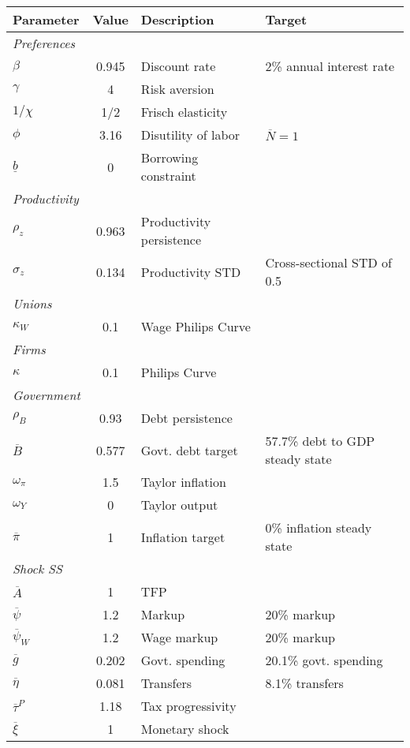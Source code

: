 \begin{tabular}{lcll}
    \toprule
    \textbf{Parameter} & \textbf{Value} & \textbf{Description} & \textbf{Target} \\
    \midrule
    \textit{Preferences} \\
    \quad $\beta$ & 0.945 & Discount rate & 2\% annual interest rate \\
    \quad $\gamma$ & 4 & Risk aversion & \textcite{kaplan2018monetary} \\
    \quad $1/\chi$ & 1/2 & Frisch elasticity & \textcite{chetty2012bounds} \\
    \quad $\phi$ & 3.16 & Disutility of labor & $\overline{N} = 1$ \\
    \quad $\underline{b}$ & 0 & Borrowing constraint \\
    \midrule
    \textit{Productivity} \\
    \quad $\rho_z$ & 0.963 & Productivity persistence & \textcite{storesletten2004cyclical} \\
    \quad $\sigma_z$ & 0.134 & Productivity STD & Cross-sectional STD of 0.5 \\
    \midrule
    \textit{Unions} \\
    \quad $\kappa_W$ & 0.1 & Wage Philips Curve \\
    \midrule
    \textit{Firms} \\
    \quad $\kappa$ & 0.1 & Philips Curve \\
    \midrule
    \textit{Government} \\
    \quad $\rho_B$ & 0.93 & Debt persistence & \textcite{auclert2024intertemporal} \\
    \quad $\overline{B}$ & 0.577 & Govt. debt target & 57.7\% debt to GDP steady state \\
    \quad $\omega_\pi$ & 1.5 & Taylor inflation \\
    \quad $\omega_Y$ & 0 & Taylor output \\
    \quad $\overline{\pi}$ & 1 & Inflation target & 0\% inflation steady state \\
    \midrule
    \textit{Shock SS} \\
    \quad $\overline{A}$ & 1 & TFP \\
    \quad $\overline{\psi}$ & 1.2 & Markup & 20\% markup \\
    \quad $\overline{\psi}_W$ & 1.2 & Wage markup & 20\% markup \\
    \quad $\overline{g}$ & 0.202 & Govt. spending & 20.1\% govt. spending \\
    \quad $\overline{\eta}$ & 0.081 & Transfers & 8.1\% transfers \\
    \quad $\overline{\tau}^P$ & 1.18 & Tax progressivity & \textcite{heathcote2017optimal} \\
    \quad $\overline{\xi}$ & 1 & Monetary shock \\
    \bottomrule
\end{tabular}